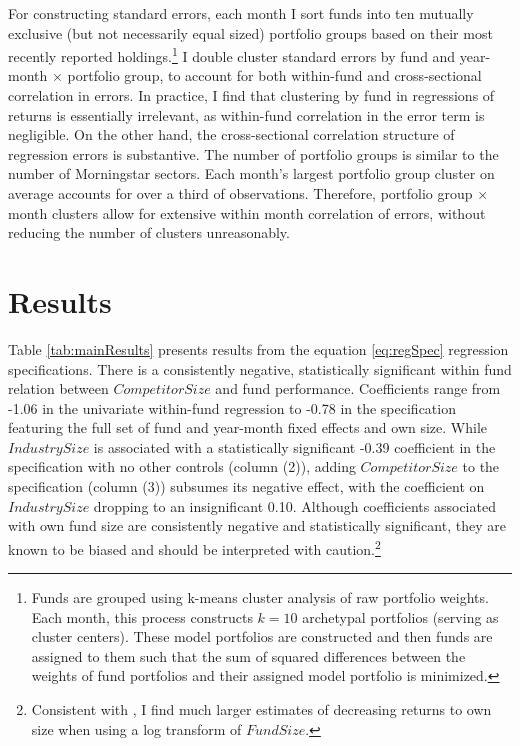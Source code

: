 \documentclass[]{book}
\let\rmarkdownfootnote\footnote%
\def\footnote{\protect\rmarkdownfootnote}
\theoremstyle{definition}
\theoremstyle{definition}
\theoremstyle{definition}
\theoremstyle{remark}
\begin{document}
For constructing standard errors, each month I sort funds into ten
mutually exclusive (but not necessarily equal sized) portfolio groups
based on their most recently reported holdings.\footnote{Funds are
  grouped using k-means cluster analysis of raw portfolio weights. Each
  month, this process constructs \(k=10\) archetypal portfolios (serving
  as cluster centers). These model portfolios are constructed and then
  funds are assigned to them such that the sum of squared differences
  between the weights of fund portfolios and their assigned model
  portfolio is minimized.} I double cluster standard errors by fund and
year-month \(\times\) portfolio group, to account for both within-fund
and cross-sectional correlation in errors. In practice, I find that
clustering by fund in regressions of returns is essentially irrelevant,
as within-fund correlation in the error term is negligible. On the other
hand, the cross-sectional correlation structure of regression errors is
substantive. The number of portfolio groups is similar to the number of
Morningstar sectors. Each month's largest portfolio group cluster on
average accounts for over a third of observations. Therefore, portfolio
group \(\times\) month clusters allow for extensive within month
correlation of errors, without reducing the number of clusters
unreasonably.

\hypertarget{results-1}{%
\section{Results}\label{results-1}}

Table \ref{tab:mainResults} presents results from the equation
\eqref{eq:regSpec} regression specifications. There is a consistently
negative, statistically significant within fund relation between
\(CompetitorSize\) and fund performance. Coefficients range from -1.06
in the univariate within-fund regression to -0.78 in the specification
featuring the full set of fund and year-month fixed effects and own
size. While \(IndustrySize\) is associated with a statistically
significant -0.39 coefficient in the specification with no other
controls (column (2)), adding \(CompetitorSize\) to the specification
(column (3)) subsumes its negative effect, with the coefficient on
\(IndustrySize\) dropping to an insignificant 0.10. Although
coefficients associated with own fund size are consistently negative and
statistically significant, they are known to be biased and should be
interpreted with caution.\footnote{Consistent with \citet{hl17}, I find
  much larger estimates of decreasing returns to own size when using a
  log transform of \(FundSize\).}
\end{document}
